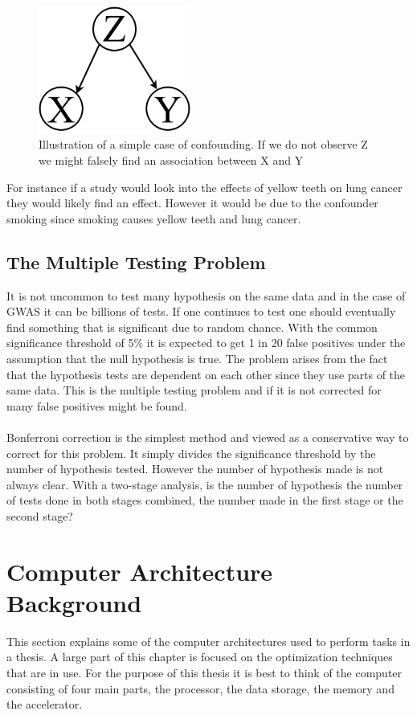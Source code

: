 \documentclass[10pt,a4paper]{report}
\begin{document}
\begin{figure}[h]
    \centering
    \includegraphics[width=5cm]{Simple_Confounding_Case.png}
    \caption{Illustration of a simple case of confounding. If we do not observe Z we might falsely find an association between X and Y}
    \label{fig:confunding}
\end{figure}

For instance if a study would look into the effects of yellow teeth on lung cancer they would likely find an effect. However it would be due to the confounder smoking since smoking causes yellow teeth and lung cancer. %

\subsection{The Multiple Testing Problem}
It is not uncommon to test many hypothesis on the same data and in the case of GWAS it can be billions of tests. If one continues to test one should eventually find something that is significant due to random chance. With the common significance threshold of 5\% it is expected to get 1 in 20 false positives under the assumption that the null hypothesis is true. The problem arises from the fact that the hypothesis tests are dependent on each other since they use parts of the same data. This is the multiple testing problem and if it is not corrected for many false positives might be found.\cite{bonferroni_multiple}\\
\\
Bonferroni correction is the simplest method and viewed as a conservative way to correct for this problem. It simply divides the significance threshold by the number of hypothesis tested. However the number of hypothesis made is not always clear. With a two-stage analysis, is the number of hypothesis the number of tests done in both stages combined, the number made in the first stage or the second stage?\cite{bonferroni_multiple}

\section{Computer Architecture Background}
This section explains some of the computer architectures used to perform tasks in a thesis. A large part of this chapter is focused on the optimization techniques that are in use. For the purpose of this thesis it is best to think of the computer consisting of four main parts, the processor, the data storage, the memory and the accelerator.
\end{document}
